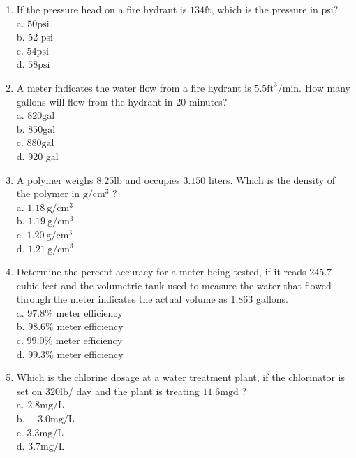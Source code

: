 \documentclass[10pt]{article}
\begin{document}
\begin{enumerate}
\item If the pressure head on a fire hydrant is $134 \mathrm{ft}$, which is the pressure in psi?\\
a. $50 \mathrm{psi}$\\
b. 52 psi\\
c. $54 \mathrm{psi}$\\
d. $58 \mathrm{psi}$

  \item A meter indicates the water flow from a fire hydrant is $5.5 \mathrm{ft}^{3} / \mathrm{min}$. How many gallons will flow from the hydrant in 20 minutes?\\
a. $820 \mathrm{gal}$\\
b. $850 \mathrm{gal}$\\
c. $880 \mathrm{gal}$\\
d. 920 gal

  \item A polymer weighs $8.25 \mathrm{lb}$ and occupies $3.150$ liters. Which is the density of the polymer in $\mathrm{g} / \mathrm{cm}^{3}$ ?\\
a. $1.18 \mathrm{~g} / \mathrm{cm}^{3}$\\
b. $1.19 \mathrm{~g} / \mathrm{cm}^{3}$\\
c. $1.20 \mathrm{~g} / \mathrm{cm}^{3}$\\
d. $1.21 \mathrm{~g} / \mathrm{cm}^{3}$

  \item Determine the percent accuracy for a meter being tested, if it reads $245.7$ cubic feet and the volumetric tank used to measure the water that flowed through the meter indicates the actual volume as 1,863 gallons.\\
a. $97.8 \%$ meter efficiency\\
b. $98.6 \%$ meter efficiency\\
c. $99.0 \%$ meter efficiency\\
d. $99.3 \%$ meter efficiency

  \item Which is the chlorine dosage at a water treatment plant, if the chlorinator is set on $320 \mathrm{lb} /$ day and the plant is treating $11.6 \mathrm{mgd}$ ?\\
a. $2.8 \mathrm{mg} / \mathrm{L}$\\
b. $\quad 3.0 \mathrm{mg} / \mathrm{L}$\\
c. $3.3 \mathrm{mg} / \mathrm{L}$\\
d. $3.7 \mathrm{mg} / \mathrm{L}$


\end{enumerate}
\end{document}

